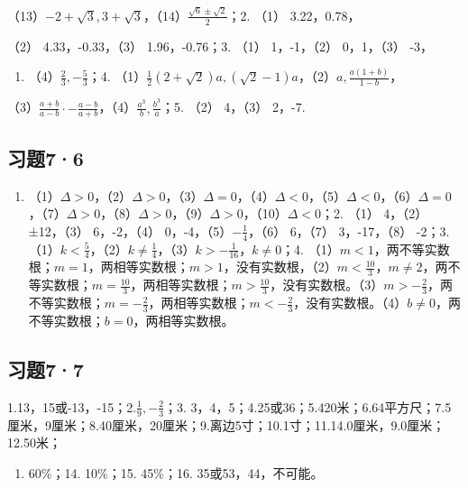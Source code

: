 （13）\(-2 + \sqrt{3}, 3 + \sqrt{3}\)，（14）\(\frac{\sqrt{6} \pm \sqrt{2}}{2}\)；2.
（1） 3.22，0.78，

（2） 4.33，-0.33，（3） 1.96，-0.76；3. （1） 1，-1，（2） 0，1，（3）
-3，

\begin{enumerate}[start=4]
\item
  （4）\(\frac{2}{3}, -\frac{5}{3}\)；4.
  （1）\(\frac{1}{2}(2 + \sqrt{2})a, (\sqrt{2} - 1)a\)，（2）\(a, \frac{a(1 + b)}{1 - b}\)，
\end{enumerate}

（3）\(\frac{a + b}{a - b} \cdot -\frac{a - b}{a + b}\)，（4）\(\frac{a^3}{b}, \frac{b^3}{a}\)；5.
（2） 4，（3） 2，-7.

\subsection{习题7·6}

\begin{enumerate}
\item
  （1）\(\Delta > 0\)，（2）\(\Delta > 0\)，（3）\(\Delta = 0\)，（4）\(\Delta < 0\)，（5）\(\Delta < 0\)，（6）\(\Delta = 0\)，（7）\(\Delta > 0\)，（8）\(\Delta > 0\)，（9）\(\Delta > 0\)，（10）\(\Delta < 0\)；2.
  （1） 4，（2） ±12，（3） 6，-2，（4）
  0，-4，（5）\(-\frac{1}{4}\)，（6） 6，（7） 3，-17，（8） -2；3.
  （1）\(k < \frac{5}{4}\)，（2）\(k \neq \frac{1}{4}\)，（3）\(k > -\frac{1}{16}\)，\(k \neq 0\)；4.
  （1）\(m < 1\)，两不等实数根；\(m = 1\)，两相等实数根；\(m > 1\)，没有实数根，（2）\(m < \frac{10}{3}\)，\(m \neq 2\)，两不等实数根；\(m = \frac{10}{3}\)，两相等实数根；\(m > \frac{10}{3}\)，没有实数根。（3）\(m > -\frac{2}{3}\)，两不等实数根；\(m = -\frac{2}{3}\)，两相等实数根；\(m < -\frac{2}{3}\)，没有实数根。（4）\(b \neq 0\)，两不等实数根；\(b = 0\)，两相等实数根。
\end{enumerate}

\subsection{习题7·7}

1.13，15或-13，-15；2.\(\frac{1}{9}, -\frac{2}{3}\)；3.
3，4，5；4.25或36；5.420米；6.64平方尺；7.5厘米，9厘米；8.40厘米，20厘米；9.离边5寸；10.1寸；11.14.0厘米，9.0厘米；12.50米；

\begin{enumerate}[start=13]
\item
  60\%；14. 10\%；15. 45\%；16. 35或53，44，不可能。
\end{enumerate}

